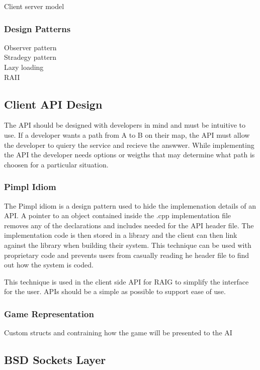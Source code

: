 \documentclass[12pt,a4paper,titlepage]{article}
\begin{document}
Client server model\\

\subsubsection{Design Patterns}
Observer pattern\\
Stradegy pattern\\
Lazy loading\\
RAII\\

\subsection{Client API Design}

The API should be designed with developers in mind and must be intuitive to use. If a developer wants a path from A to B on their map, the API must allow the developer to quiery the service and recieve the answwer. While implementing the API the developer needs options or weigths that may determine what path is choosen for a particular situation. 

\subsubsection{Pimpl Idiom}

The Pimpl idiom is a design pattern used to hide the implemenation details of an API. A pointer to an object contained inside the .cpp implementation file removes any of the declarations and includes needed for the API header file. The implementation code is then stored in a library and the client can then link against the library when building their system. This technique can be used with proprietary code and prevents users from casually reading he header file to find out how the system is coded. 

This technique is used in the client side API for RAIG to simplify the interface for the user. APIs should be a simple as possible to support ease of use. 

\subsubsection{Game Representation}

Custom structs and contraining how the game will be presented to the AI


\subsection{BSD Sockets Layer}
\end{document}

